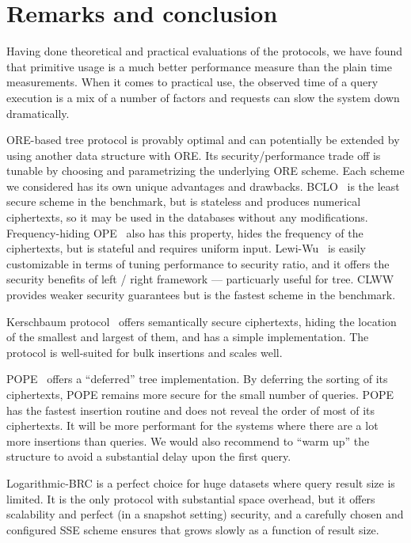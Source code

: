 \section{Remarks and conclusion}\label{sec:conclusion}

	Having done theoretical and practical evaluations of the protocols, we have found that primitive usage is a much better performance measure than the plain time measurements.
	When it comes to practical use, the observed time of a query execution is a mix of a number of factors and {\IO} requests can slow the system down dramatically.

	ORE-based {\BPlus} tree protocol is provably {\IO} optimal and can potentially be extended by using another data structure with ORE\@.
	Its security/performance trade off is tunable by choosing and parametrizing the underlying ORE scheme.
	Each scheme we considered has its own unique advantages and drawbacks.
	BCLO~\cite{bclo-ope} is the least secure scheme in the benchmark, but is stateless and produces numerical ciphertexts, so it may be used in the databases without any modifications.
	Frequency-hiding OPE~\cite{fh-ope} also has this property, hides the frequency of the ciphertexts, but is stateful and requires uniform input.
	Lewi-Wu~\cite{lewi-wu-ore} is easily customizable in terms of tuning performance to security ratio, and it offers the security benefits of left / right framework --- particuarly useful for {\BPlus} tree.
	CLWW~\cite{clww-ore} provides weaker security guarantees but is the fastest scheme in the benchmark.

	Kerschbaum protocol~\cite{florian-protocol} offers semantically secure ciphertexts, hiding the location of the smallest and largest of them, and has a simple implementation.
	The protocol is well-suited for bulk insertions and scales well.

	\balance%

	POPE~\cite{pope} offers a ``deferred'' {\BPlus} tree implementation.
	By deferring the sorting of its ciphertexts, POPE remains more secure for the small number of queries.
	POPE has the fastest insertion routine and does not reveal the order of most of its ciphertexts.
	It will be more performant for the systems where there are a lot more insertions than queries.
	We would also recommend to ``warm up'' the structure to avoid a substantial delay upon the first query.

	Logarithmic\hyp{}BRC is a perfect choice for huge datasets where query result size is limited.
	It is the only protocol with substantial space overhead, but it offers scalability and perfect (in a snapshot setting) security,
	and a carefully chosen and configured SSE scheme ensures that {\IO} grows slowly as a function of result size.

